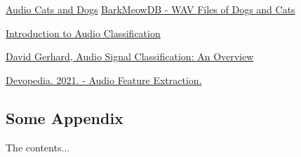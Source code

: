 \documentclass[12pt a4paper]{article}
\numberwithin{equation}{section}
\begin{document}
\begin{thebibliography}{2}
 \href{https://www.kaggle.com/mmoreaux/audio-cats-and-dogs}{Audio Cats and Dogs}
 \href{https://zenodo.org/record/3563990#.YZ99xtDMK3B}{BarkMeowDB - WAV Files of Dogs and Cats}

 \href{https://www.analyticsvidhya.com/blog/2021/06/introduction-to-audio-classification/}{Introduction to Audio Classification}

 \href{http://www2.cs.uregina.ca/~gerhard/publications/CAI00.pdf}{David Gerhard, Audio Signal Classification: An Overview}

 \href{https://devopedia.org/audio-feature-extraction}{Devopedia. 2021. - Audio Feature Extraction.}

\end{thebibliography}


\begin{appendices}
\chapter{Some Appendix}
The contents...
\end{appendices}  
\end{document}
